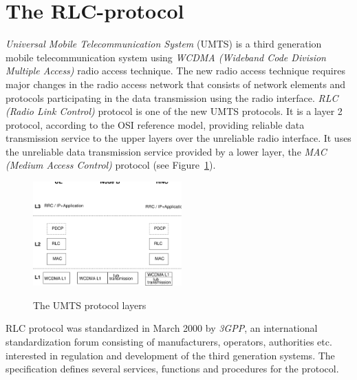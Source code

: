 \documentclass{entcs} \usepackage{entcsmacro}
\begin{document}
\section{The RLC-protocol}

\emph{Universal Mobile Telecommunication System} (UMTS) is a third
generation mobile telecommunication system using \emph{WCDMA (Wideband
Code Division Multiple Access)} radio access technique. The new radio
access technique requires major changes in the radio access network that
consists of network elements and protocols participating in the data
transmission using the radio interface. \emph{RLC (Radio Link Control)}
protocol is one of the new UMTS protocols. It is a layer 2 protocol,
according to the OSI reference model, providing reliable data
transmission service to the upper layers over the unreliable radio
interface.  It uses the unreliable data transmission service provided
by a lower layer, the \emph{MAC (Medium Access Control)} protocol (see
Figure~\ref{mac}).



\begin{figure}
\begin{center}
  \includegraphics[height=4.0cm]{umtskerrokset2.eps}\\
  \caption{The UMTS protocol layers}
  \label{mac}
\end{center}
\end{figure}

RLC protocol was standardized in March 2000 by \emph{3GPP}, an
international standardization forum consisting of manufacturers,
operators, authorities etc. interested in regulation and development
of the third generation systems. The specification \cite{3g-RLC} defines
several services, functions and procedures for the protocol.
\end{document}

